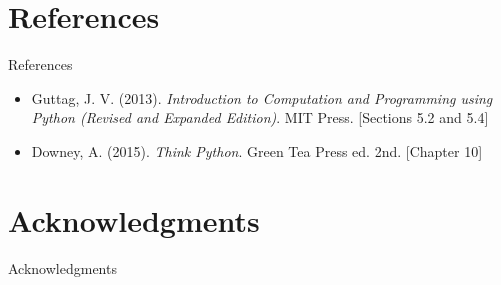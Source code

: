 \documentclass[t,handout,9pt]{beamer}
\begin{document}
\section{References}
\begin{frame}{References}
\begin{itemize}
	\item Guttag, J. V. (2013). \textit{Introduction to Computation and Programming using Python (Revised and Expanded Edition)}. MIT Press. [Sections 5.2 and 5.4]
	\item Downey, A. (2015). \textit{Think Python}. Green Tea Press ed. 2nd. [Chapter 10]
\end{itemize}
\end{frame}
\section{Acknowledgments}
\begin{frame}{Acknowledgments}
\end{frame}
%

\end{document}
